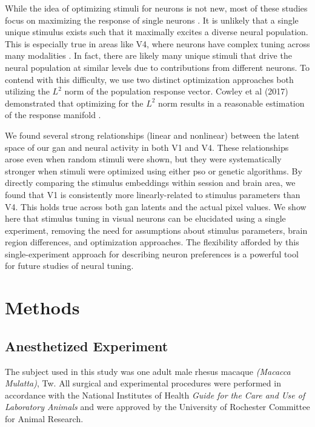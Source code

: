 While the idea of optimizing stimuli for neurons is not new, most of these studies focus on maximizing the response of single neurons \parencite{Ponce2019, Bashivan2019}.  It is unlikely that a single unique stimulus exists such that it maximally excites a diverse neural population. This is especially true in areas like V4, where neurons have complex tuning across many modalities \parencite{Pasupathy2002}. In fact, there are likely many unique stimuli that drive the neural population at similar levels due to contributions from different neurons. To contend with this difficulty, we use two distinct optimization approaches both utilizing the $L^2$ norm of the population response vector. Cowley et al (2017) demonstrated that optimizing for the $L^2$ norm results in a reasonable estimation of the response manifold \parencite{Cowley2017}.

We found several strong relationships (linear and nonlinear) between the latent space of our \gls{gan} and neural activity in both V1 and V4. These relationships arose even when random stimuli were shown, but they were systematically stronger when stimuli were optimized using either \gls{pso} or genetic algorithms. By directly comparing the stimulus embeddings within session and brain area, we found that V1 is consistently more linearly-related to stimulus parameters than V4. This holds true across both \gls{gan} latents and the actual pixel values. We show here that stimulus tuning in visual neurons can be elucidated using a single experiment, removing the need for assumptions about stimulus parameters, brain region differences, and optimization approaches. The flexibility afforded by this single-experiment approach for describing neuron preferences is a powerful tool for future studies of neural tuning.


\section{Methods}

\subsection{Anesthetized Experiment}
The subject used in this study was one adult male rhesus macaque \textit{(Macacca Mulatta)}, Tw. All surgical and experimental procedures were performed in accordance with the National Institutes of Health \textit{Guide for the Care and Use of Laboratory Animals} and were approved by the University of Rochester Committee for Animal Research.

